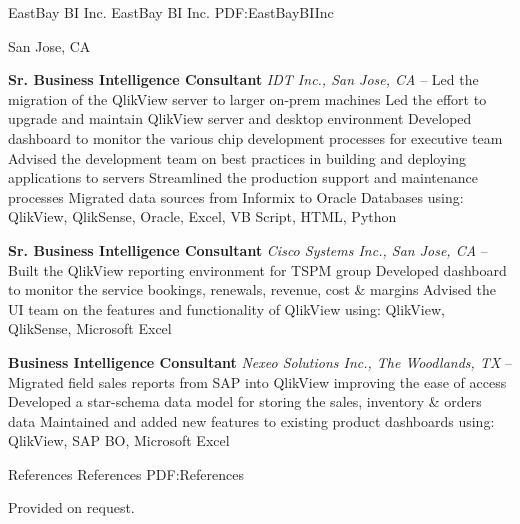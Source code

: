 \documentclass[letterpaper,MMMyyyy,nonstopmode]{simpleresumecv}
\newcommand{\Company}{}
\newcommand{\CVNote}{Resume compiled on {\today} for a DE role at \Company}
\begin{document}
\begin{Body}
\endgroup

\BigGap\BigGap

\SubSection
{EastBay BI Inc.}
{EastBay BI Inc.}
{PDF:EastBayBIInc}
\par San Jose, CA

\BigGap

\begingroup
\textbf{Sr. Business Intelligence Consultant}
\newline
\textit{IDT Inc., San Jose, CA}
\hfill
{} --
\BulletItem Led the migration of the QlikView server to larger on-prem machines
\BulletItem Led the effort to upgrade and maintain QlikView server and desktop environment
\BulletItem Developed dashboard to monitor the various chip development processes for executive team
\BulletItem Advised the development team on best practices in building and deploying applications to servers
\BulletItem Streamlined the production support and maintenance processes
\BulletItem Migrated data sources from Informix to Oracle Databases
\BulletItem using: QlikView, QlikSense, Oracle, Excel, VB Script, HTML, Python
\endgroup

\BigGap

\begingroup
\textbf{Sr. Business Intelligence Consultant}
\newline
\textit{Cisco Systems Inc., San Jose, CA}
\hfill
{} --
\BulletItem Built the QlikView reporting environment for TSPM group
\BulletItem Developed dashboard to monitor the service bookings, renewals, revenue, cost \& margins
\BulletItem Advised the UI team on the features and functionality of QlikView
\BulletItem using: QlikView, QlikSense, Microsoft Excel
\endgroup

\BigGap

\begingroup
\textbf{Business Intelligence Consultant}
\newline
\textit{Nexeo Solutions Inc., The Woodlands, TX}
\hfill
{} --
\BulletItem Migrated field sales reports from SAP into QlikView improving the ease of access
\BulletItem Developed a star-schema data model for storing the sales, inventory \& orders data
\BulletItem Maintained and added new features to existing product dashboards
\BulletItem using: QlikView, SAP BO, Microsoft Excel
\endgroup



\Section
{References}
{References}
{PDF:References}

\Entry Provided on request.

\end{Body}

\BigGap
\UseNoteFont%
\end{document}
